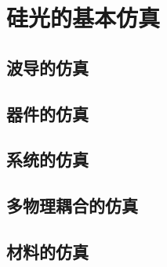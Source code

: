 \chapter{硅光的基本仿真}

\section{波导的仿真}

\section{器件的仿真}

\section{系统的仿真}

\section{多物理耦合的仿真}

\section{材料的仿真}